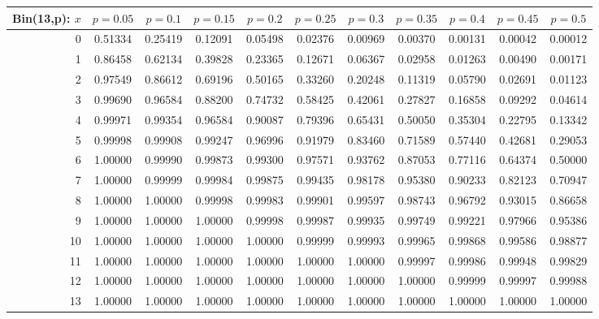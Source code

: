 \documentclass{article}
\begin{document}
{\vspace{8pt minus 6pt}
\begin{tabular}{@{\extracolsep{-2pt}}|r|c|c|c|c|c|c|c|c|c|c|}
\hline
Bin(13,p): $x$
   & $p\!=\!0.05$& $p\!=\!0.1$& $p\!=\!0.15$& $p\!=\!0.2$& $p\!=\!0.25$& $p\!=\!0.3$& $p\!=\!0.35$& $p\!=\!0.4$& $p\!=\!0.45$& $p\!=\!0.5$\\\hline
  0&0.51334&0.25419&0.12091&0.05498&0.02376&0.00969&0.00370&0.00131&0.00042&0.00012\\
  1&0.86458&0.62134&0.39828&0.23365&0.12671&0.06367&0.02958&0.01263&0.00490&0.00171\\
  2&0.97549&0.86612&0.69196&0.50165&0.33260&0.20248&0.11319&0.05790&0.02691&0.01123\\
  3&0.99690&0.96584&0.88200&0.74732&0.58425&0.42061&0.27827&0.16858&0.09292&0.04614\\
  4&0.99971&0.99354&0.96584&0.90087&0.79396&0.65431&0.50050&0.35304&0.22795&0.13342\\
  5&0.99998&0.99908&0.99247&0.96996&0.91979&0.83460&0.71589&0.57440&0.42681&0.29053\\
  6&1.00000&0.99990&0.99873&0.99300&0.97571&0.93762&0.87053&0.77116&0.64374&0.50000\\
  7&1.00000&0.99999&0.99984&0.99875&0.99435&0.98178&0.95380&0.90233&0.82123&0.70947\\
  8&1.00000&1.00000&0.99998&0.99983&0.99901&0.99597&0.98743&0.96792&0.93015&0.86658\\
  9&1.00000&1.00000&1.00000&0.99998&0.99987&0.99935&0.99749&0.99221&0.97966&0.95386\\
 10&1.00000&1.00000&1.00000&1.00000&0.99999&0.99993&0.99965&0.99868&0.99586&0.98877\\
 11&1.00000&1.00000&1.00000&1.00000&1.00000&1.00000&0.99997&0.99986&0.99948&0.99829\\
 12&1.00000&1.00000&1.00000&1.00000&1.00000&1.00000&1.00000&0.99999&0.99997&0.99988\\
 13&1.00000&1.00000&1.00000&1.00000&1.00000&1.00000&1.00000&1.00000&1.00000&1.00000\\
\hline
\end{tabular}

}
\end{document}
